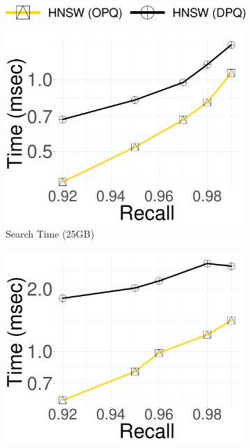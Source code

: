 \begin{figure}[htbp]
	\captionsetup{justification=centering}
	\centering	
\centering
    \begin{subfigure}[b]{0.4\textwidth}
        \includegraphics[width=\textwidth]{../img/oigas/PQVSPQS/legend.png}
    \end{subfigure}
    
    \centering
    \begin{subfigure}[b]{0.28\textwidth}
        \captionsetup{justification=centering}
	\centering	
        \includegraphics[width=\textwidth]{../img/oigas/PQVSPQS/25GB/deep_10_Time.pdf}
        \caption{Search Time (25GB)}
        \label{fig:SPQ:25GB_Time}
    \end{subfigure}
    \hspace{0.4cm}
    \begin{subfigure}[b]{0.28\textwidth}
        \captionsetup{justification=centering}
	\centering	
        \includegraphics[width=\textwidth]{../img/oigas/PQVSPQS/100GB/deep_10_Time.pdf}

\end{subfigure}
\end{figure}
